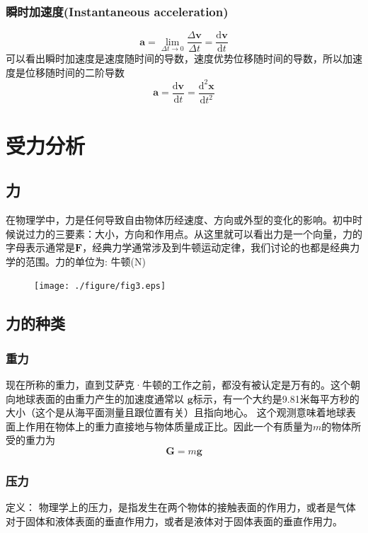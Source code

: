 \documentclass[a4paper,oneside,11pt]{article}
\newcommand{\bol}[1]{\textbf{#1}}
\newcommand{\diff}{\mathrm{d}}
\begin{document}
\subsubsection{瞬时加速度(Instantaneous acceleration)}
\begin{displaymath}
	\bol{a} = \lim_{\Delta t \to 0} \frac{\Delta \bol{v}}{\Delta t} = \frac{\diff \bol{v}}{\diff t}
\end{displaymath}
可以看出瞬时加速度是速度随时间的导数，速度优势位移随时间的导数，所以加速度是位移随时间的二阶导数
\begin{displaymath}
	\bol{a} = \frac{\diff \bol{v}}{\diff t} = \frac{\diff^2 \bol{x}}{\diff t^2}
\end{displaymath}
\newpage
\section{受力分析}
\subsection{力}
在物理学中，力是任何导致自由物体历经速度、方向或外型的变化的影响。初中时候说过力的三要素：大小，方向和作用点。从这里就可以看出力是一个向量，力的字母表示通常是$\bol{F}$，经典力学通常涉及到牛顿运动定律，我们讨论的也都是经典力学的范围。力的单位为: 牛顿(N)
\begin{figure}[!h]
\centering
\texttt{[image: ./figure/fig3.eps]}
\end{figure}
\subsection{力的种类}
\subsubsection{重力}
现在所称的重力，直到艾萨克·牛顿的工作之前，都没有被认定是万有的。这个朝向地球表面的由重力产生的加速度通常以 $\bol{g}$标示，有一个大约是9.81米每平方秒的大小（这个是从海平面测量且跟位置有关）且指向地心。 这个观测意味着地球表面上作用在物体上的重力直接地与物体质量成正比。因此一个有质量为$m$的物体所受的重力为
\begin{displaymath}
	\bol{G} = m\bol{g}
\end{displaymath}
\subsubsection{压力}
定义： 物理学上的压力，是指发生在两个物体的接触表面的作用力，或者是气体对于固体和液体表面的垂直作用力，或者是液体对于固体表面的垂直作用力。
\end{document}
